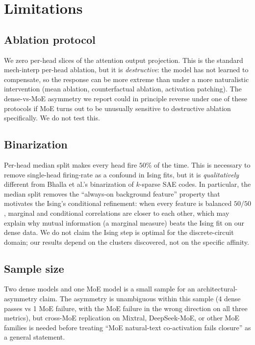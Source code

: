 \documentclass[11pt]{article}
\begin{document}
\section{Limitations}
\label{sec:limitations}

\subsection{Ablation protocol}
We zero per-head slices of the attention output projection. This is the
standard mech-interp per-head ablation, but it is \emph{destructive}:
the model has not learned to compensate, so the response can be more
extreme than under a more naturalistic intervention (mean ablation,
counterfactual ablation, activation patching). The dense-vs-MoE asymmetry
we report could in principle reverse under one of these protocols if MoE
turns out to be unusually sensitive to destructive ablation specifically.
We do not test this.

\subsection{Binarization}
Per-head median split makes every head fire $50\%$ of the time. This is
necessary to remove single-head firing-rate as a confound in Ising fits,
but it is \emph{qualitatively} different from Bhalla et al.'s
binarization of $k$-sparse SAE codes. In particular, the median split
removes the ``always-on background feature'' property that motivates the
Ising's conditional refinement: when every feature is balanced $50/50$,
marginal and conditional correlations are closer to each other, which may
explain why mutual information (a marginal measure) beats the Ising fit
on our dense data. We do not claim the Ising step is optimal for the
discrete-circuit domain; our results depend on the clusters discovered,
not on the specific affinity.

\subsection{Sample size}
Two dense models and one MoE model is a small sample for an
architectural-asymmetry claim. The asymmetry is unambiguous within this
sample (4 dense passes vs 1 MoE failure, with the MoE failure in the wrong
direction on all three metrics), but cross-MoE replication on Mixtral,
DeepSeek-MoE, or other MoE families is needed before treating ``MoE
natural-text co-activation fails closure'' as a general statement.
\end{document}
